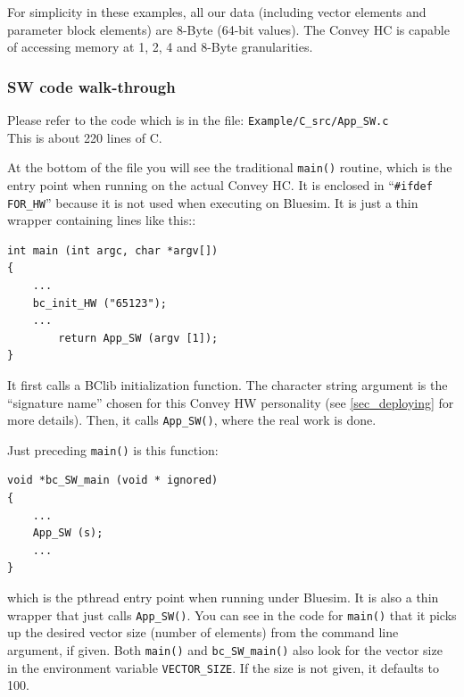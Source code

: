 \documentclass[twoside,letterpaper,11pt]{article}
\newcommand{\hm}{\hspace*{1em}}
\begin{document}
For simplicity in these examples, all our data (including vector
elements and parameter block elements) are 8-Byte (64-bit values).
The Convey HC is capable of accessing memory at 1, 2, 4 and 8-Byte
granularities.


\subsubsection{SW code walk-through}

\label{sec_SW_code_walk_through}

Please refer to the code which is in the file: \hm \verb|Example/C_src/App_SW.c| \\
This is about 220 lines of C.

At the bottom of the file you will see the traditional \verb|main()|
routine, which is the entry point when running on the actual Convey
HC.  It is enclosed in ``\verb|#ifdef FOR_HW|'' because it is not used
when executing on Bluesim.  It is just a thin wrapper containing lines
like this::
\begin{Verbatim}[frame=single, label=App\_SW.c] 
int main (int argc, char *argv[])
{
    ...
    bc_init_HW ("65123");
    ...
        return App_SW (argv [1]);
}
\end{Verbatim}

It first calls a BClib initialization function.  The character string
argument is the ``signature name'' chosen for this Convey HW
personality (see \ref{sec_deploying} for more details).  Then, it
calls \verb|App_SW()|, where the real work is done.

Just preceding \verb|main()| is this function:

\begin{Verbatim}[frame=single, label=App\_SW.c] 
void *bc_SW_main (void * ignored)
{
    ...
    App_SW (s);
    ...
}
\end{Verbatim}
which is the pthread entry point when running under Bluesim.  It is
also a thin wrapper that just calls \verb|App_SW()|.
You can see in the code for \verb|main()| that it picks up the desired
vector size (number of elements) from the command line argument, if
given.  Both \verb|main()| and \verb|bc_SW_main()| also look for the
vector size in the environment variable \verb|VECTOR_SIZE|.  If the
size is not given, it defaults to 100.
\end{document}
